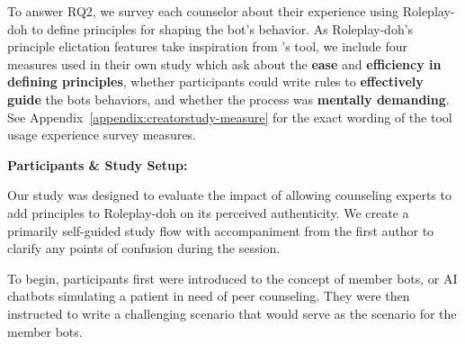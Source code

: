 
To answer RQ2, we survey each counselor about their experience using Roleplay-doh to define principles for shaping the bot's behavior. 
As Roleplay-doh's principle elictation features take inspiration from \citeauthor{petridis2023constitutionmaker}'s tool, we include four measures used in their own study which ask about the \textbf{ease} and \textbf{efficiency in defining principles}, whether participants could write rules to \textbf{effectively guide} the bots behaviors, and whether the process was \textbf{mentally demanding}. See Appendix~\ref{appendix:creatorstudy-measure} for the exact wording of the tool usage experience survey measures. %


\textbf{Participants \& Study Setup:}


Our study was designed to evaluate the impact of allowing counseling experts to add principles to Roleplay-doh on its perceived authenticity. We create a primarily self-guided study flow with accompaniment from the first author to clarify any points of confusion during the session.

To begin, participants first were introduced to the concept of member bots, or AI chatbots simulating a patient in need of peer counseling. They were then instructed to write a challenging scenario that would serve as the scenario for the member bots. 

